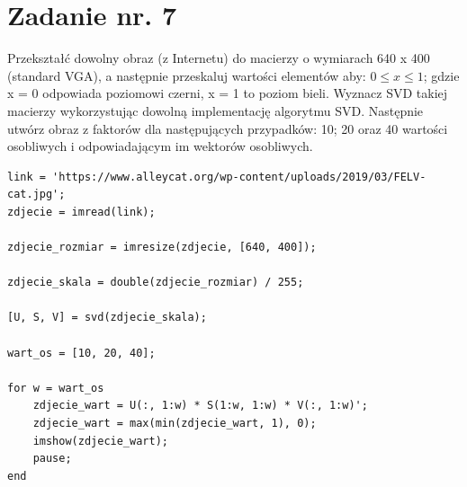 \documentclass{article}
\begin{document}
\section{Zadanie nr. 7}
Przekształć dowolny obraz (z Internetu) do macierzy o wymiarach 640 x 400 (standard
VGA), a następnie przeskaluj wartości elementów aby: $0\leq x\leq 1$; gdzie x = 0 odpowiada
poziomowi czerni, x = 1 to poziom bieli. Wyznacz SVD takiej macierzy wykorzystując dowolną
implementację algorytmu SVD. Następnie utwórz obraz z faktorów dla następujących przypadków: 10; 20 oraz 40 wartości osobliwych i odpowiadającym im wektorów osobliwych.
\begin{lstlisting}
link = 'https://www.alleycat.org/wp-content/uploads/2019/03/FELV-cat.jpg';
zdjecie = imread(link);

zdjecie_rozmiar = imresize(zdjecie, [640, 400]);

zdjecie_skala = double(zdjecie_rozmiar) / 255;

[U, S, V] = svd(zdjecie_skala);

wart_os = [10, 20, 40];

for w = wart_os
    zdjecie_wart = U(:, 1:w) * S(1:w, 1:w) * V(:, 1:w)';
    zdjecie_wart = max(min(zdjecie_wart, 1), 0);
    imshow(zdjecie_wart);
    pause;
end

\end{lstlisting}  
\end{document}

